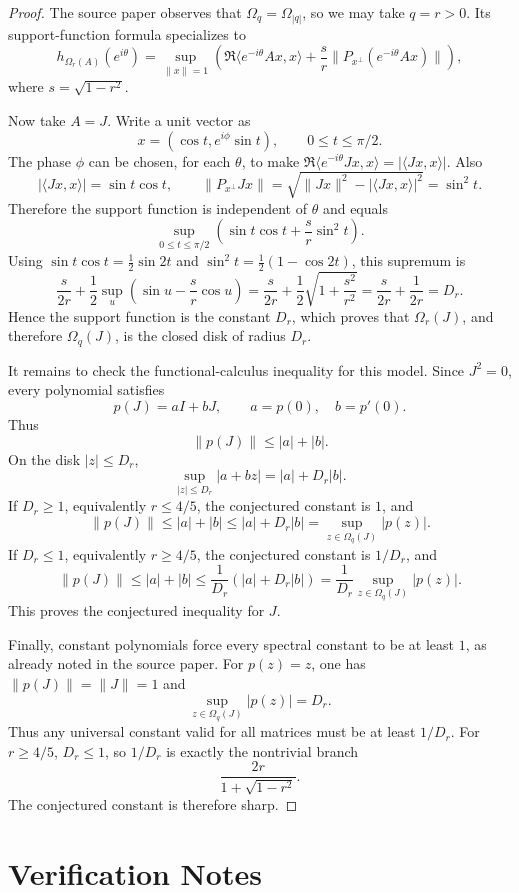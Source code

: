\documentclass[11pt]{article}
\begin{document}
\begin{proof}
The source paper observes that \(\Omega_q=\Omega_{|q|}\), so we may take
\(q=r>0\).  Its support-function formula specializes to
\[
h_{\Omega_r(A)}(e^{i\theta})
=
\sup_{\|x\|=1}\left(
  \Re\langle e^{-i\theta}Ax,x\rangle
  +\frac{s}{r}\|P_{x^\perp}(e^{-i\theta}Ax)\|
\right),
\]
where \(s=\sqrt{1-r^2}\).

Now take \(A=J\).  Write a unit vector as
\[
x=(\cos t,e^{i\phi}\sin t),\qquad 0\le t\le \pi/2 .
\]
The phase \(\phi\) can be chosen, for each \(\theta\), to make
\(\Re\langle e^{-i\theta}Jx,x\rangle=|\langle Jx,x\rangle|\).  Also
\[
|\langle Jx,x\rangle|=\sin t\cos t,\qquad
\|P_{x^\perp}Jx\|
=\sqrt{\|Jx\|^2-|\langle Jx,x\rangle|^2}
=\sin^2 t .
\]
Therefore the support function is independent of \(\theta\) and equals
\[
\sup_{0\le t\le\pi/2}
\left(\sin t\cos t+\frac{s}{r}\sin^2 t\right).
\]
Using \(\sin t\cos t=\frac12\sin 2t\) and
\(\sin^2t=\frac12(1-\cos2t)\), this supremum is
\[
\frac{s}{2r}
+\frac12\sup_u\left(\sin u-\frac{s}{r}\cos u\right)
=
\frac{s}{2r}
+\frac12\sqrt{1+\frac{s^2}{r^2}}
=
\frac{s}{2r}+\frac1{2r}
=D_r .
\]
Hence the support function is the constant \(D_r\), which proves that
\(\Omega_r(J)\), and therefore \(\Omega_q(J)\), is the closed disk of radius
\(D_r\).

It remains to check the functional-calculus inequality for this model.  Since
\(J^2=0\), every polynomial satisfies
\[
p(J)=aI+bJ,\qquad a=p(0),\quad b=p'(0).
\]
Thus
\[
\|p(J)\|\le |a|+|b|.
\]
On the disk \(|z|\le D_r\),
\[
\sup_{|z|\le D_r}|a+bz|=|a|+D_r|b|.
\]
If \(D_r\ge1\), equivalently \(r\le4/5\), the conjectured constant is \(1\), and
\[
\|p(J)\|\le |a|+|b|\le |a|+D_r|b|
=\sup_{z\in\Omega_q(J)}|p(z)|.
\]
If \(D_r\le1\), equivalently \(r\ge4/5\), the conjectured constant is
\(1/D_r\), and
\[
\|p(J)\|\le |a|+|b|
\le \frac1{D_r}(|a|+D_r|b|)
=\frac1{D_r}\sup_{z\in\Omega_q(J)}|p(z)|.
\]
This proves the conjectured inequality for \(J\).

Finally, constant polynomials force every spectral constant to be at least
\(1\), as already noted in the source paper.  For \(p(z)=z\), one has
\(\|p(J)\|=\|J\|=1\) and
\[
\sup_{z\in\Omega_q(J)}|p(z)|=D_r .
\]
Thus any universal constant valid for all matrices must be at least \(1/D_r\).
For \(r\ge4/5\), \(D_r\le1\), so \(1/D_r\) is exactly the nontrivial branch
\[
\frac{2r}{1+\sqrt{1-r^2}}.
\]
The conjectured constant is therefore sharp.
\end{proof}

\section*{Verification Notes}
\end{document}
